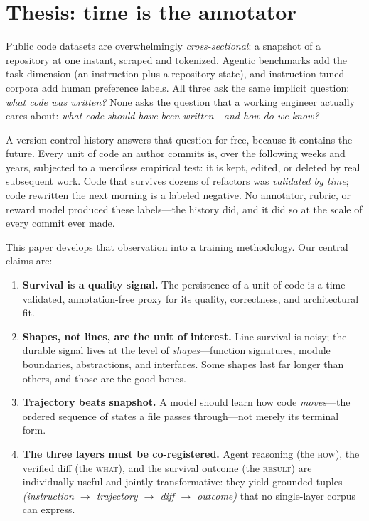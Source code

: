 \documentclass[11pt,letterpaper]{article}
\begin{document}
\tableofcontents
\newpage

\section{Thesis: time is the annotator}

Public code datasets are overwhelmingly \emph{cross-sectional}: a snapshot of a
repository at one instant, scraped and tokenized. Agentic benchmarks add the
task dimension (an instruction plus a repository state), and instruction-tuned
corpora add human preference labels. All three ask the same implicit question:
\emph{what code was written?} None asks the question that a working engineer
actually cares about: \emph{what code should have been written---and how do we
know?}

A version-control history answers that question for free, because it contains
the future. Every unit of code an author commits is, over the following weeks
and years, subjected to a merciless empirical test: it is kept, edited, or
deleted by real subsequent work. Code that survives dozens of refactors was
\emph{validated by time}; code rewritten the next morning is a labeled negative.
No annotator, rubric, or reward model produced these labels---the history did,
and it did so at the scale of every commit ever made.

This paper develops that observation into a training methodology. Our central
claims are:

\begin{enumerate}
\item \textbf{Survival is a quality signal.} The persistence of a unit of code
is a time-validated, annotation-free proxy for its quality, correctness, and
architectural fit.
\item \textbf{Shapes, not lines, are the unit of interest.} Line survival is
noisy; the durable signal lives at the level of \emph{shapes}---function
signatures, module boundaries, abstractions, and interfaces. Some shapes last
far longer than others, and those are the good bones.
\item \textbf{Trajectory beats snapshot.} A model should learn how code
\emph{moves}---the ordered sequence of states a file passes through---not merely
its terminal form.
\item \textbf{The three layers must be co-registered.} Agent reasoning (the
\textsc{how}), the verified diff (the \textsc{what}), and the survival outcome
(the \textsc{result}) are individually useful and jointly transformative: they
yield grounded tuples \textit{(instruction $\to$ trajectory $\to$ diff $\to$
outcome)} that no single-layer corpus can express.
\end{enumerate}
\end{document}
